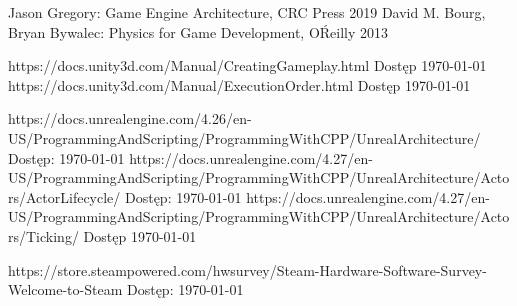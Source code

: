 \documentclass[12pt,twoside]{article}
\begin{document}
\begin{thebibliography}{4}
 Jason Gregory: Game Engine Architecture, CRC Press 2019
 David M. Bourg, Bryan Bywalec: Physics for Game Development, O\'Reilly 2013

 https://docs.unity3d.com/Manual/CreatingGameplay.html Dostęp \today
{} https://docs.unity3d.com/Manual/ExecutionOrder.html Dostęp \today

 https://docs.unrealengine.com/4.26/en-US/ProgrammingAndScripting/ProgrammingWithCPP/UnrealArchitecture/ Dostęp: \today
{} https://docs.unrealengine.com/4.27/en-US/ProgrammingAndScripting/ProgrammingWithCPP/UnrealArchitecture/Actors/ActorLifecycle/ Dostęp: \today
{} https://docs.unrealengine.com/4.27/en-US/ProgrammingAndScripting/ProgrammingWithCPP/UnrealArchitecture/Actors/Ticking/ Dostęp \today

 https://store.steampowered.com/hwsurvey/Steam-Hardware-Software-Survey-Welcome-to-Steam Dostęp: \today

\end{thebibliography}

\clearpage

\makesummary
\end{document}
